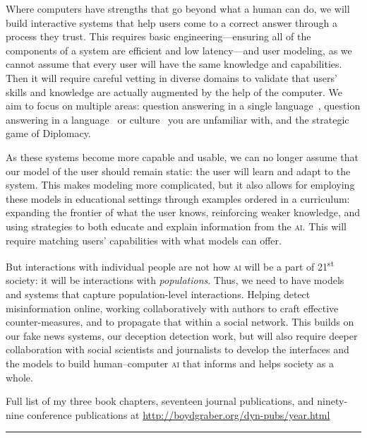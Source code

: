 \documentclass[11pt]{amsart}
\newcommand{\abr}[1]{\textsc{#1}}
\begin{document}
Where computers have strengths that go beyond what a human can do, we
will build interactive systems that help users come to a correct
answer through a process they trust.
%
This requires basic engineering---ensuring all of the components of
a system are efficient and low latency---and user modeling, as we
cannot assume that every user will have the same knowledge and
capabilities.
%
Then it will require careful vetting in diverse domains to validate
that users' skills and knowledge are actually augmented by the help of
the computer.
%
We aim to focus on multiple areas: question answering in a single
language~\cite{He-22}, question answering in a language~\cite{han-22}
or culture~\cite{peskov-21} you are unfamiliar with, and the strategic
game of Diplomacy.

As these systems become more capable and usable, we can no longer
assume that our model of the user should remain static: the user will
learn and adapt to the system.
%
This makes modeling more complicated, but it also allows for employing
these models in educational settings through examples ordered in a
curriculum: expanding the frontier of what the user knows, reinforcing
weaker knowledge, and using strategies to both educate and explain
information from the \abr{ai}.
%
This will require matching users' capabilities with what models can
offer.

But interactions with individual people are not how \abr{ai} will be a
part of 21\textsuperscript{st} society: it will be interactions with
\emph{populations}.
%
Thus, we need to have models and systems that capture population-level
interactions.
%
Helping detect misinformation online, working collaboratively with
authors to craft effective counter-measures, and to propagate that
within a social network.
%
This builds on our fake news systems, our deception detection work,
but will also require deeper collaboration with social scientists and
journalists to develop the interfaces and the models to build
human--computer \abr{ai} that informs and helps society as a whole.




\clearpage




\begin{center}
Full list of my three book chapters, seventeen journal publications, and ninety-nine conference
publications at \url{http://boydgraber.org/dyn-pubs/year.html}
\end{center}


\noindent\rule{4cm}{0.4pt}
\end{document}
